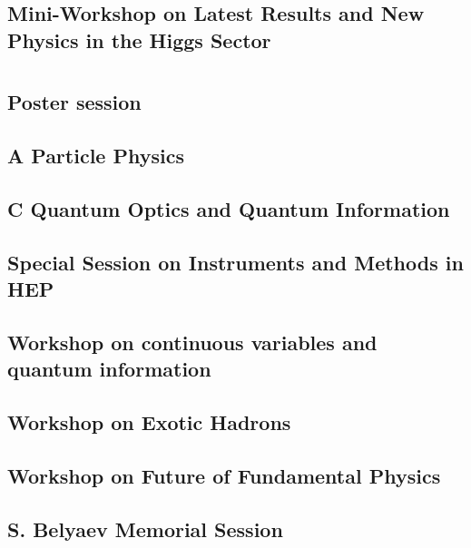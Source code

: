 \subsection{Mini-Workshop on Latest Results and New Physics in the Higgs Sector}

\clearpage

\section{}
\subsection{Poster session}

\clearpage

\subsection{A Particle Physics}

\clearpage

\subsection{C Quantum Optics and Quantum Information}

\clearpage

\subsection{Special Session on Instruments and Methods in HEP}

\clearpage

\subsection{Workshop on continuous variables and quantum information}

\clearpage

\subsection{Workshop on Exotic Hadrons}

\clearpage

\subsection{Workshop on Future of Fundamental Physics}

\clearpage

\subsection{S. Belyaev Memorial Session}

\clearpage

